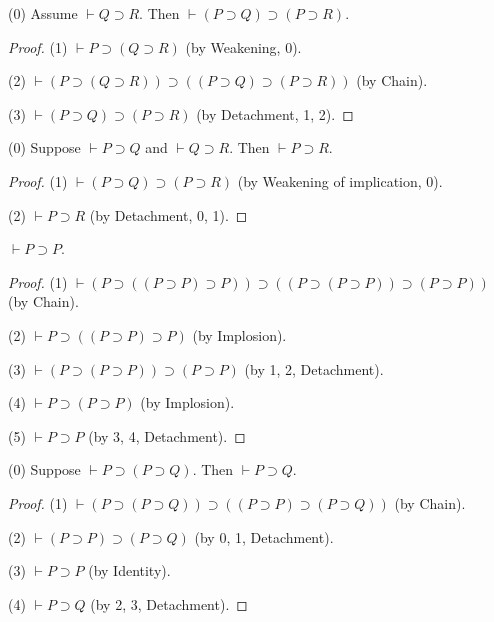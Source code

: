 \documentclass{article}
\newcommand{\imp}{\supset}
\newcommand{\deducible}{\vdash}
\begin{document}
\begin{forthel}
\begin{proposition}[id=Weakening of implication]
    (0) Assume $\deducible Q\imp R$.
    Then $\deducible (P\imp Q)\imp (P \imp R)$.
\end{proposition}
\begin{proof}
    (1) $\deducible P\imp (Q\imp R)$ (by Weakening, 0).
    
    (2) $\deducible (P\imp (Q\imp R))\imp ((P\imp Q)\imp (P\imp R))$ (by Chain).
     
    (3) $\deducible (P\imp Q)\imp (P\imp R)$ (by Detachment, 1, 2).
\end{proof}

\begin{proposition}[id=Transitivity]
    (0) Suppose $\deducible P\imp Q$ and $\deducible Q\imp R$.
    Then $\deducible P\imp R$.
\end{proposition}
\begin{proof}
    (1) $\deducible (P\imp Q)\imp (P\imp R)$ (by Weakening of implication, 0).
    
    (2) $\deducible P\imp R$  (by Detachment, 0, 1).
\end{proof}

\begin{proposition}[id=Identity]
    $\deducible P\imp P$.
\end{proposition}
\begin{proof}
    (1) $\deducible (P\imp ((P\imp P)\imp P))\imp ((P\imp (P\imp P))\imp (P\imp P))$ (by Chain).
    
    (2) $\deducible P\imp ((P\imp P)\imp P)$ (by Implosion).
    
    (3) $\deducible (P\imp (P\imp P))\imp (P\imp P)$ (by 1, 2, Detachment).
    
    (4) $\deducible P\imp (P\imp P)$ (by Implosion).
    
    (5) $\deducible P\imp P$ (by 3, 4, Detachment).
\end{proof}

\begin{proposition}
    (0) Suppose $\deducible P\imp (P\imp Q)$.
    Then $\deducible P\imp Q$.
\end{proposition}
\begin{proof}
    (1) $\deducible (P\imp (P\imp Q))\imp ((P\imp P)\imp (P\imp Q))$ (by Chain).
    
    (2) $\deducible (P\imp P)\imp (P\imp Q)$ (by 0, 1, Detachment).
    
    (3) $\deducible P\imp P$  (by Identity).
    
    (4) $\deducible P\imp Q$  (by 2, 3, Detachment).
\end{proof}
\end{forthel}
\end{document}
